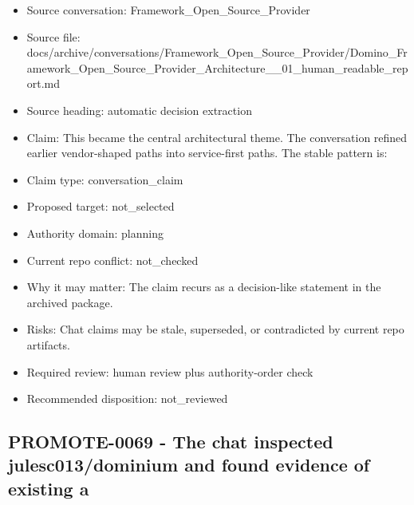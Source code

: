\documentclass[11pt,a4paper]{report}
\begin{document}
\begin{itemize}
\item Source conversation: Framework\_Open\_Source\_Provider
\item Source file: docs/archive/conversations/Framework\_Open\_Source\_Provider/Domino\_Framework\_Open\_Source\_Provider\_Architecture\_\_01\_human\_readable\_report.md
\item Source heading: automatic decision extraction
\item Claim: This became the central architectural theme. The conversation refined earlier vendor-shaped paths into service-first paths. The stable pattern is:
\item Claim type: conversation\_claim
\item Proposed target: not\_selected
\item Authority domain: planning
\item Current repo conflict: not\_checked
\item Why it may matter: The claim recurs as a decision-like statement in the archived package.
\item Risks: Chat claims may be stale, superseded, or contradicted by current repo artifacts.
\item Required review: human review plus authority-order check
\item Recommended disposition: not\_reviewed
\end{itemize}

\subsection{PROMOTE-0069 - The chat inspected julesc013/dominium and found evidence of existing a}
\end{document}
